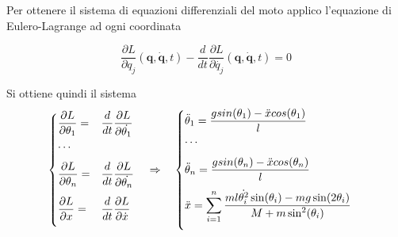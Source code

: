 \documentclass[12pt]{article}
\begin{document}
Per ottenere il sistema di equazioni differenziali del moto 
applico l'equazione di Eulero-Lagrange ad ogni coordinata

\[
\frac{{\partial L}}{{\partial q_j}}\left(\textbf{q}, \dot{\textbf{q}}, t\right) - \frac{{d}}{{dt}} \frac{{\partial L}}
{{\partial \dot{q_j}}}\left(\textbf{q}, \dot{\textbf{q}}, t\right) = 0 
\]

Si ottiene quindi il sistema
\[
\begin{cases}
     \dfrac{\partial L}{\partial \theta_1} =& \dfrac{d}{dt}\dfrac{\partial L}{\partial \dot{\theta_1}} \\
     \vspace{.3cm}
    \ldots \\
    \vspace{.3cm}
    \dfrac{\partial L}{\partial \theta_n} =& \dfrac{d}{dt}\dfrac{\partial L}{\partial \dot{\theta_n}} \\
    \vspace{.3cm}
    \dfrac{\partial L}{\partial x} =& \dfrac{d}{dt}\dfrac{\partial L}{\partial \dot{x}} \\
\end{cases}
\quad \Rightarrow \quad
\displaystyle
\begin{cases}
    \ddot{\theta}_1 = \dfrac{gsin(\theta_1)-\ddot{x}cos(\theta_1)}{l} \\
    \vspace{.3cm}
    \ldots \\
    \vspace{.3cm}
    \ddot{\theta}_n = \dfrac{gsin(\theta_n)-\ddot{x}cos(\theta_n)}{l} \\
    \vspace{.3cm}
    \displaystyle
    \ddot{x} = \sum_{i=1}^{n}  \frac{ml \dot{\theta_i^2 } \sin(\theta_i)-mg \sin (2 \theta_i)}{M+m \sin^2(\theta_i)} \\
  \end{cases}
\]
\end{document}
